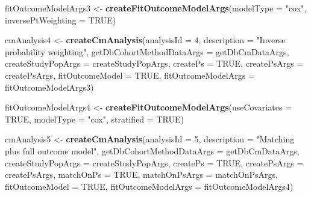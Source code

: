 \documentclass[
]{article}
\newenvironment{Shaded}{\begin{snugshade}}{\end{snugshade}}
\newcommand{\DataTypeTok}[1]{\textcolor[rgb]{0.13,0.29,0.53}{#1}}
\newcommand{\DecValTok}[1]{\textcolor[rgb]{0.00,0.00,0.81}{#1}}
\newcommand{\KeywordTok}[1]{\textcolor[rgb]{0.13,0.29,0.53}{\textbf{#1}}}
\newcommand{\NormalTok}[1]{#1}
\newcommand{\OtherTok}[1]{\textcolor[rgb]{0.56,0.35,0.01}{#1}}
\newcommand{\StringTok}[1]{\textcolor[rgb]{0.31,0.60,0.02}{#1}}
\begin{document}
\begin{Shaded}
\begin{Highlighting}[]
\NormalTok{fitOutcomeModelArgs3 <-}\StringTok{ }\KeywordTok{createFitOutcomeModelArgs}\NormalTok{(}\DataTypeTok{modelType =} \StringTok{"cox"}\NormalTok{,}
                                                  \DataTypeTok{inversePtWeighting =} \OtherTok{TRUE}\NormalTok{)}

\NormalTok{cmAnalysis4 <-}\StringTok{ }\KeywordTok{createCmAnalysis}\NormalTok{(}\DataTypeTok{analysisId =} \DecValTok{4}\NormalTok{,}
                                \DataTypeTok{description =} \StringTok{"Inverse probability weighting"}\NormalTok{,}
                                \DataTypeTok{getDbCohortMethodDataArgs =}\NormalTok{ getDbCmDataArgs,}
                                \DataTypeTok{createStudyPopArgs =}\NormalTok{ createStudyPopArgs,}
                                \DataTypeTok{createPs =} \OtherTok{TRUE}\NormalTok{,}
                                \DataTypeTok{createPsArgs =}\NormalTok{ createPsArgs,}
                                \DataTypeTok{fitOutcomeModel =} \OtherTok{TRUE}\NormalTok{,}
                                \DataTypeTok{fitOutcomeModelArgs =}\NormalTok{ fitOutcomeModelArgs3)}

\NormalTok{fitOutcomeModelArgs4 <-}\StringTok{ }\KeywordTok{createFitOutcomeModelArgs}\NormalTok{(}\DataTypeTok{useCovariates =} \OtherTok{TRUE}\NormalTok{,}
                                                  \DataTypeTok{modelType =} \StringTok{"cox"}\NormalTok{,}
                                                  \DataTypeTok{stratified =} \OtherTok{TRUE}\NormalTok{)}

\NormalTok{cmAnalysis5 <-}\StringTok{ }\KeywordTok{createCmAnalysis}\NormalTok{(}\DataTypeTok{analysisId =} \DecValTok{5}\NormalTok{,}
                                \DataTypeTok{description =} \StringTok{"Matching plus full outcome model"}\NormalTok{,}
                                \DataTypeTok{getDbCohortMethodDataArgs =}\NormalTok{ getDbCmDataArgs,}
                                \DataTypeTok{createStudyPopArgs =}\NormalTok{ createStudyPopArgs,}
                                \DataTypeTok{createPs =} \OtherTok{TRUE}\NormalTok{,}
                                \DataTypeTok{createPsArgs =}\NormalTok{ createPsArgs,}
                                \DataTypeTok{matchOnPs =} \OtherTok{TRUE}\NormalTok{,}
                                \DataTypeTok{matchOnPsArgs =}\NormalTok{ matchOnPsArgs,}
                                \DataTypeTok{fitOutcomeModel =} \OtherTok{TRUE}\NormalTok{,}
                                \DataTypeTok{fitOutcomeModelArgs =}\NormalTok{ fitOutcomeModelArgs4)}


\end{Highlighting}
\end{Shaded}
\end{document}
